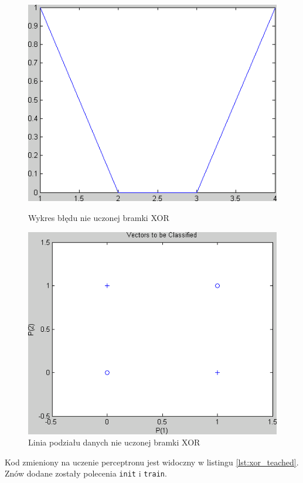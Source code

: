 \documentclass[pointlessnumbers, abstracton, headsepline, a4paper]{scrartcl}
\begin{document}
\begin{figure}[h]
\centering
\begin{minipage}{0.4\textwidth}
\includegraphics[scale=0.4]{figures/xor_error_unlearned.png}
        \caption{\label{fig:xor_error_unlearned}Wykres błędu nie uczonej bramki XOR}
\end{minipage}
\qquad
\begin{minipage}{0.4\textwidth}
\includegraphics[scale=0.4]{figures/xor_data_unlearned.png}
\caption{\label{fig:xor_data_unlearned}Linia podziału danych nie uczonej bramki XOR}
\end{minipage}
\end{figure}

Kod zmieniony na uczenie perceptronu jest widoczny w listingu \ref{lst:xor_teached}. Znów dodane zostały polecenia \texttt{init} i \texttt{train}.
\end{document}
